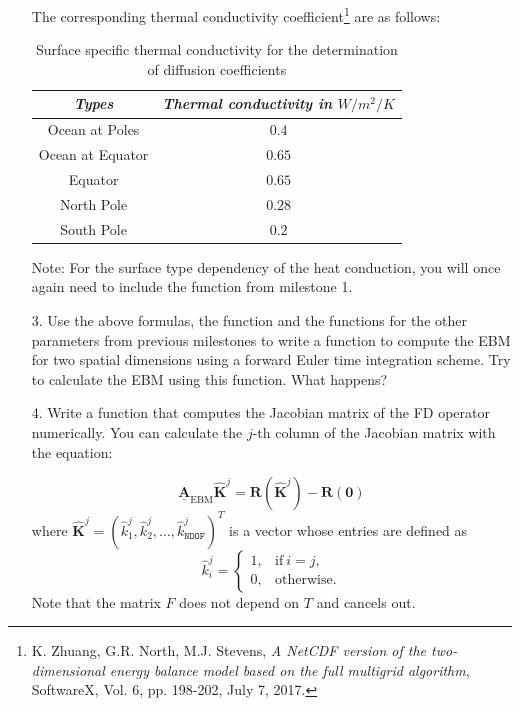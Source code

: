 \documentclass[10pt]{scrartcl}
\begin{document}
\begin{enumerate}
\bigskip
\noindent
The corresponding thermal conductivity coefficient\footnote{K. Zhuang, G.R. North, M.J. Stevens, {\em A NetCDF version of the two-dimensional energy balance model based on the full multigrid algorithm}, SoftwareX, Vol. 6, pp. 198-202, July 7, 2017.} are as follows:

\begin{table}[!h]
\small
	\begin{center}
	\begin{tabular}{|c|c|}
	\hline
	\textit{Types}& \textit{Thermal conductivity in $W/m^2/K$} \\
	\hline
	Ocean at Poles& $ 0.4$ \\
	Ocean at Equator&  $ 0.65$ \\
	Equator& $ 0.65$ \\
	North Pole& $ 0.28$ \\
	South Pole& $ 0.2$ \\
	\hline
	\end{tabular}
\caption{Surface specific thermal conductivity for the determination of diffusion coefficients}
	\label{thermal conductivity}
	\end{center}
\end{table}

Note: For the surface type dependency of the heat conduction, you will once again need to include the function \small\texttt{} \normalsize from milestone 1.


\item[3.] Use the above formulas, the function \small\texttt{} \normalsize and the functions for the other parameters from previous milestones to write a function \small\texttt{} \normalsize to compute the EBM for two spatial dimensions using a forward Euler time integration scheme. Try to calculate the EBM using this function. What happens?

\item[4.] Write a function \small\texttt{} \normalsize that computes the Jacobian matrix of the FD operator numerically. You can calculate the $j$-th column of the Jacobian matrix with the equation:

\begin{equation*}
\underline{\mathbf{A}}_{\text{EBM}} \hat{\mathbf{K}}^j = \mathbf{R}(\hat{\mathbf{K}}^j)-\mathbf{R}(\mathbf{0})
\end{equation*}
where $\hat{\mathbf{K}}^j = (\hat{k}^j_1, \hat{k}^j_2, \ldots, \hat{k}^j_\texttt{NDOF})^T$ is a vector whose entries are defined as
\begin{equation}
\hat{k}^j_i =
\begin{cases}
1, & \mathrm{if} \  i = j, \\
0, & \mathrm{otherwise}.
\end{cases}
\end{equation}
Note that the matrix $F$ does not depend on $T$ and cancels out.


\end{enumerate}
\end{document}
